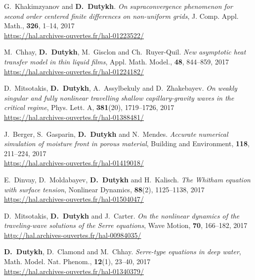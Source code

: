 \begin{etaremune}
  
  \item G.~Khakimzyanov and \textbf{D.~Dutykh}. \textit{On supraconvergence phenomenon for second order centered finite differences on non-uniform grids}, J. Comp. Appl. Math., \textbf{326}, 1--14, 2017 \\ %
  \url{https://hal.archives-ouvertes.fr/hal-01223522/}

  \item M.~Chhay, \textbf{D.~Dutykh}, M.~Gisclon and Ch.~Ruyer-Quil. \textit{New asymptotic heat transfer model in thin liquid films}, Appl. Math. Model., \textbf{48}, 844--859, 2017 \\ %
  \url{https://hal.archives-ouvertes.fr/hal-01224182/}
  
  \item D.~Mitsotakis, \textbf{D.~Dutykh}, A.~Assylbekuly and D.~Zhakebayev. \textit{On weakly singular and fully nonlinear travelling shallow capillary-gravity waves in the critical regime}, Phys. Lett. A, \textbf{381}(20), 1719--1726, 2017 \\ %
  \url{https://hal.archives-ouvertes.fr/hal-01388481/}
  
  \item J.~Berger, S.~Gasparin, \textbf{D.~Dutykh} and N.~Mendes. \textit{Accurate numerical simulation of moisture front in porous material}, Building and Environment, \textbf{118}, 211--224, 2017 \\ %
  \url{https://hal.archives-ouvertes.fr/hal-01419018/}
  
  \item E.~Dinvay, D.~Moldabayev, \textbf{D.~Dutykh} and H.~Kalisch. \textit{The Whitham equation with surface tension}, Nonlinear Dynamics, \textbf{88}(2), 1125--1138, 2017 \\ %
  \url{https://hal.archives-ouvertes.fr/hal-01504047/}

  \item D.~Mitsotakis, \textbf{D.~Dutykh} and J.~Carter. \textit{On the nonlinear dynamics of the traveling-wave solutions of the Serre equations}, Wave Motion, \textbf{70}, 166--182, 2017 \\ %
  \url{http://hal.archives-ouvertes.fr/hal-00984035/}

  \item \textbf{D.~Dutykh}, D.~Clamond and M.~Chhay. \textit{Serre-type equations in deep water}, Math. Model. Nat. Phenom., \textbf{12}(1), 23--40, 2017 \\ %
  \url{https://hal.archives-ouvertes.fr/hal-01340379/}


\end{etaremune}
